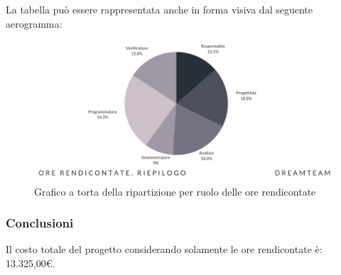 La tabella può essere rappresentata anche in forma visiva dal seguente aerogramma:
\begin{figure}[H]
\centering
\includegraphics[scale=0.65]{Sezioni/SezioniPreventivo/grafici/Riepilogo_ore_rendicontate_costi.png}
\caption{Grafico a torta della ripartizione per ruolo delle ore rendicontate}
\end{figure}

\subsubsection{Conclusioni}
Il costo totale del progetto considerando solamente le ore rendicontate è: 13.325,00\euro.